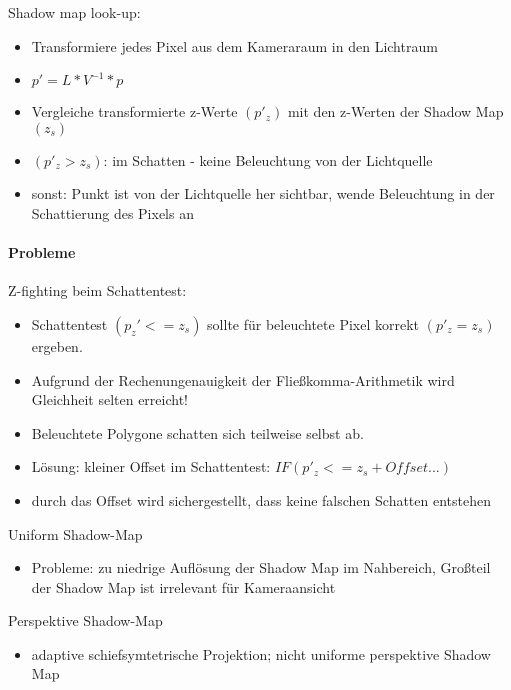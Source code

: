 \documentclass[10pt,landscape]{article}
\begin{document}
\begin{multicols}{3}

Shadow map look-up:
\begin{itemize}
  \item Transformiere jedes Pixel aus dem Kameraraum in den Lichtraum
  \item $p'=L*V^{-1}*p$
  \item Vergleiche transformierte z-Werte $(p'_z)$ mit den z-Werten der Shadow Map $(z_s)$
  \item $(p'_z>z_s)$: im Schatten - keine Beleuchtung von der Lichtquelle
  \item sonst: Punkt ist von der Lichtquelle her sichtbar, wende Beleuchtung in der Schattierung des Pixels an
\end{itemize}

\paragraph{Probleme}
Z-fighting beim Schattentest:
\begin{itemize}
  \item Schattentest $(p_z' <= z_s )$ sollte für beleuchtete Pixel korrekt $(p'_z = z_s)$ ergeben.
  \item Aufgrund der Rechenungenauigkeit der Fließkomma-Arithmetik wird Gleichheit selten erreicht!
  \item Beleuchtete Polygone schatten sich teilweise selbst ab.
  \item Lösung: kleiner Offset im Schattentest: $IF (p'_z <= z_s + Offset...)$
  \item durch das Offset wird sichergestellt, dass keine falschen Schatten entstehen
\end{itemize}

Uniform Shadow-Map
\begin{itemize}
  \item Probleme: zu niedrige Auflösung der Shadow Map im Nahbereich, Großteil der Shadow Map ist irrelevant für Kameraansicht
\end{itemize}

Perspektive Shadow-Map
\begin{itemize}
  \item adaptive schiefsymtetrische Projektion; nicht uniforme perspektive Shadow Map
\end{itemize}


\end{multicols}
\end{document}

